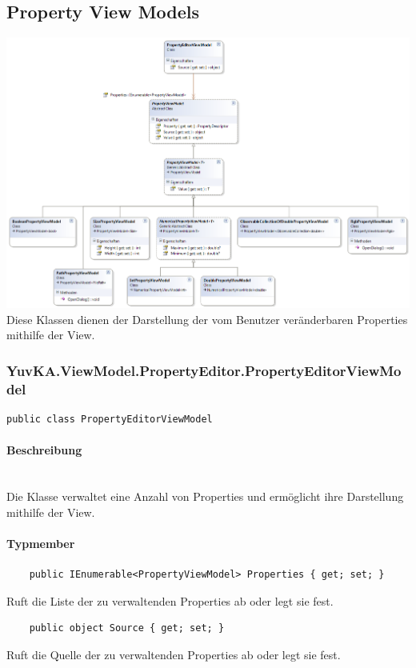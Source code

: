\subsection{Property View Models}


\includegraphics[width=\textwidth]{YuvKA.ViewModel.PropertyEditor/propertyEditor.png}
Diese Klassen dienen der Darstellung der vom Benutzer veränderbaren Properties mithilfe der View. 



\subsubsection{YuvKA.ViewModel.PropertyEditor.PropertyEditorViewModel}

\begin{verbatim}
public class PropertyEditorViewModel
\end{verbatim}

\paragraph{Beschreibung}~\\
Die Klasse  verwaltet eine Anzahl von Properties und ermöglicht ihre Darstellung mithilfe der View.

\paragraph{Typmember}
\begin{itemize}

	\begin{verbatim}
	public IEnumerable<PropertyViewModel> Properties { get; set; }
	\end{verbatim}
	Ruft die Liste der zu verwaltenden Properties ab oder legt sie fest.

	\begin{verbatim}
	public object Source { get; set; }
	\end{verbatim}
	Ruft die Quelle der zu verwaltenden Properties ab oder legt sie fest.

\end{itemize}




